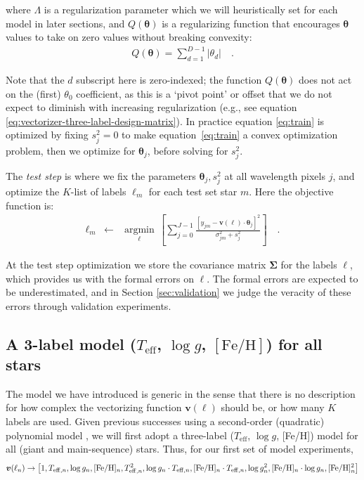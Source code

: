 \documentclass[preprint,trackchanges]{aastex}
\newcommand{\teff}{T_{\mathrm{eff}}}
\newcommand{\logg}{\log g}
\newcommand{\feh}{[\mathrm{Fe/H}]}
\newcommand{\Dvector}[1]{\boldsymbol{#1}}
\newcommand{\vectheta}{\Dvector{\theta}}
\newcommand{\vecv}{\Dvector{v}}
\newcommand{\argmin}[1]{\underset{#1}{\operatorname{argmin}}\,}
\begin{document}
\noindent{}where $\Lambda$ is a regularization parameter which we will heuristically set
for each model in later sections, and $Q(\vectheta)$ is a regularizing function that 
encourages $\vectheta$ values to take on zero values without breaking convexity:
\begin{eqnarray}\label{eq:regularization-function}
	Q(\vectheta) = \sum_{d=1}^{D-1} |{\theta_d}| \quad .
\end{eqnarray}

Note that the $d$ subscript here is zero-indexed; the function $Q(\vectheta)$ does not act
on the (first) $\theta_0$ coefficient, as this is a `pivot point' or offset that we do not
expect to diminish with increasing regularization (e.g., see equation 
\ref{eq:vectorizer-three-label-design-matrix}).  In practice equation \ref{eq:train} is 
optimized by fixing $s_j^2 = 0$ to make equation~\ref{eq:train} a convex optimization 
problem, then we optimize for $\vectheta_j$, before solving for $s_j^2$.  


The \emph{test step} is where we fix the parameters $\vectheta_j,s_j^2$ at all wavelength
pixels $j$, and optimize the $K$-list of labels $\ell_m$ for each test set star $m$.  Here
the objective function is:
\begin{eqnarray}\label{eq:test}
  \ell_m &\leftarrow& \argmin{\ell}\left[
    \sum_{j=0}^{J-1} \frac{[y_{jm}-\vecv(\ell)\cdot\vectheta_j]^2}{\sigma_{jm}^2 + s_j^2}
    \right]
  \quad .
\end{eqnarray}

At the test step optimization we store the covariance matrix $\bm{\Sigma}$ for the labels
$\ell$, which provides us with the formal errors on $\ell$.  The formal errors are expected
to be underestimated, and in Section \ref{sec:validation} we judge the veracity of these 
errors through validation experiments.


\subsection{A 3-label model ($\teff$, $\logg$, $\feh$) for all stars}
\label{sec:a-simple-model}

The model we have introduced is generic in the sense that there is no description for how
complex the vectorizing function $\vecv(\ell)$ should be, or how many $K$ labels are used.
Given previous successes using a second-order (quadratic) polynomial model 
\citep{Ness_2015,Ness_2016,Ho_2016,Casey_2016b}, we will first adopt a three-label ($\teff$, $\logg$, [Fe/H]) model for all (giant and main-sequence) stars. Thus, for our first set of
model experiments,
\begin{eqnarray}\label{eq:vectorizer-three-label}
\vecv(\ell_n) \rightarrow \left[1, T_{{\rm eff},n}, \logg_n, [{\rm Fe/H}]_n, T_{{\rm eff},n}^2, \logg_n\cdot{}T_{{\rm eff},n}, \feh_n\cdot{}T_{{\rm eff},n}, \logg_n^2, \feh_n\cdot\logg_n, \feh_n^2\right]
\end{eqnarray}
\end{document}
